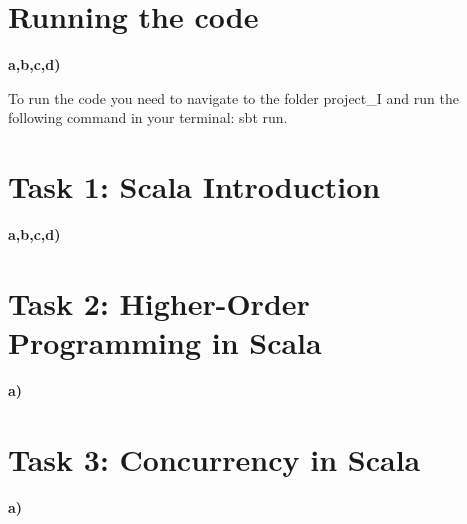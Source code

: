 \documentclass{article}
\begin{document}


\section*{\textbf{Running the code}}
\vspace*{12pt}\small\textbf{a,b,c,d)}

To run the code you need to navigate to the folder project_I and run the following command in your terminal: sbt run.


\section*{\textbf{Task 1: Scala Introduction}}
\vspace*{12pt}\small\textbf{a,b,c,d)}


\section*{\textbf{Task 2: Higher-Order Programming in Scala}}
\vspace*{12pt}\small\textbf{a)}

\section*{\textbf{Task 3: Concurrency in Scala}}
\vspace*{12pt}\small\textbf{a)}
\end{document}

